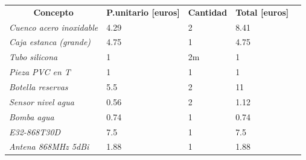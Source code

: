 \documentclass[12pt]{article}
\begin{document}
	\begin{table}[h!]
		\centering
		\begin{tabular}{l|l|l|l|l}
			\cline{1-4}
			\multicolumn{1}{|c|}{\textbf{Concepto}}                         & \multicolumn{1}{c|}{\textbf{P.unitario {[}euros{]}}} & \multicolumn{1}{c|}{\textbf{Cantidad}} & \multicolumn{1}{c|}{\textbf{Total {[}euros{]}}} &  \\ \cline{1-4}
			\multicolumn{1}{|l|}{\textit{Cuenco acero inoxidable}}          & 4.29                                                 & 2                                      & 8.41                                            &  \\ \cline{1-4}
			\multicolumn{1}{|l|}{\textit{Caja estanca (grande)}} & 4.75                                                 & 1                                      & 4.75                                            &  \\ \cline{1-4}
			\multicolumn{1}{|l|}{\textit{Tubo silicona}}                    & 1                                                    & 2m                                     & 1                                               &  \\ \cline{1-4}
			\multicolumn{1}{|l|}{\textit{Pieza PVC en T}}                   & 1                                                    & 1                                      & 1                                               &  \\ \cline{1-4}
			\multicolumn{1}{|l|}{\textit{Botella reservas}}                 & 5.5                                                  & 2                                      & 11                                              &  \\ \cline{1-4}
			\multicolumn{1}{|l|}{\textit{Sensor nivel agua}}                & 0.56                                                 & 2                                      & 1.12                                            &  \\ \cline{1-4}
			\multicolumn{1}{|l|}{\textit{Bomba agua}}                       & 0.74                                                 & 1                                      & 0.74                                            &  \\ \cline{1-4}
			\multicolumn{1}{|l|}{\textit{E32-868T30D}}                      & 7.5                                                  & 1                                      & 7.5                                             &  \\ \cline{1-4}
			\multicolumn{1}{|l|}{\textit{Antena 868MHz 5dBi}}               & 1.88                                                 & 1                                      & 1.88                                            &  \\ \cline{1-4}

\end{tabular}
\end{table}
\end{document}
